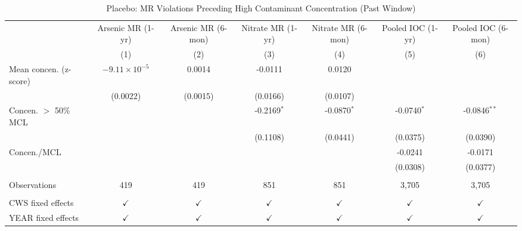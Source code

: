 
\begin{table}[htbp]
\caption{Placebo: MR Violations Preceding High Contaminant Concentration (Past Window)}\label{tab:mr_concentration_lag_placebo}
\centering
\begin{adjustbox}{width = \textwidth, center}
   \begin{tabular}{lcccccc}
      \toprule    
                                       & Arsenic MR (1-yr)      & Arsenic MR (6-mon)   & Nitrate MR (1-yr) & Nitrate MR (6-mon)   & Pooled IOC (1-yr)  & Pooled IOC (6-mon) \\   
                                       & (1)                    & (2)                  & (3)               & (4)                  & (5)                & (6)\\  
      \midrule 
      Mean concen. (z-score)                    & $-9.11\times 10^{-5}$  & 0.0014               & -0.0111           & 0.0120               &                    &   \\   
                                       & (0.0022)               & (0.0015)             & (0.0166)          & (0.0107)             &                    &   \\   
      Concen. $>$ 50\% MCL                        &                        &                      & -0.2169$^{*}$     & -0.0870$^{*}$        & -0.0740$^{*}$      & -0.0846$^{**}$\\   
                                       &                        &                      & (0.1108)          & (0.0441)             & (0.0375)           & (0.0390)\\   
      Concen./MCL                            &                        &                      &                   &                      & -0.0241            & -0.0171\\   
                                       &                        &                      &                   &                      & (0.0308)           & (0.0377)\\   
       \\
      Observations                     & 419                    & 419                  & 851               & 851                  & 3,705              & 3,705\\  
       \\
      CWS fixed effects              & $\checkmark$           & $\checkmark$         & $\checkmark$      & $\checkmark$         & $\checkmark$       & $\checkmark$\\   
      YEAR fixed effects               & $\checkmark$           & $\checkmark$         & $\checkmark$      & $\checkmark$         & $\checkmark$       & $\checkmark$\\   

\end{tabular}
\end{adjustbox}
\end{table}
